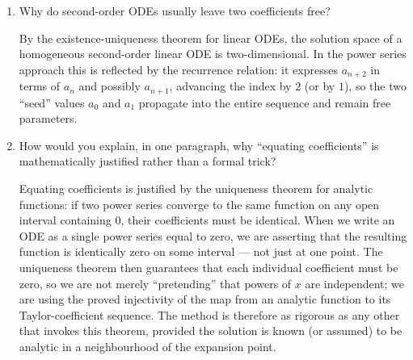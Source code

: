 \documentclass{self-check}
\begin{document}
\begin{enumerate}[leftmargin=*, itemsep=8pt]
  \item Why do second-order ODEs usually leave two coefficients free?
    \begin{answer}
      By the existence-uniqueness theorem for linear ODEs, the
      solution space of a homogeneous second-order linear ODE is
      two-dimensional. In the power series approach this is reflected
      by the recurrence relation: it expresses $a_{n+2}$ in terms of
      $a_n$ and possibly $a_{n+1}$, advancing the index by $2$ (or by
      $1$), so the two ``seed'' values $a_0$ and $a_1$ propagate into
      the entire sequence and remain free parameters.
    \end{answer}

  \item How would you explain, in one paragraph, why ``equating
    coefficients'' is mathematically justified rather than a formal trick?
    \begin{answer}
      Equating coefficients is justified by the uniqueness theorem
      for analytic functions: if two power series converge to the
      same function on any open interval containing $0$, their
      coefficients must be identical. When we write an ODE as a
      single power series equal to zero, we are asserting that the
      resulting function is identically zero on some interval --- not
      just at one point. The uniqueness theorem then guarantees that
      each individual coefficient must be zero, so we are not merely
      ``pretending'' that powers of $x$ are independent; we are using
      the proved injectivity of the map from an analytic function to
      its Taylor-coefficient sequence. The method is therefore as
      rigorous as any other that invokes this theorem, provided the
      solution is known (or assumed) to be analytic in a
      neighbourhood of the expansion point.
    \end{answer}
\end{enumerate}
\end{document}
